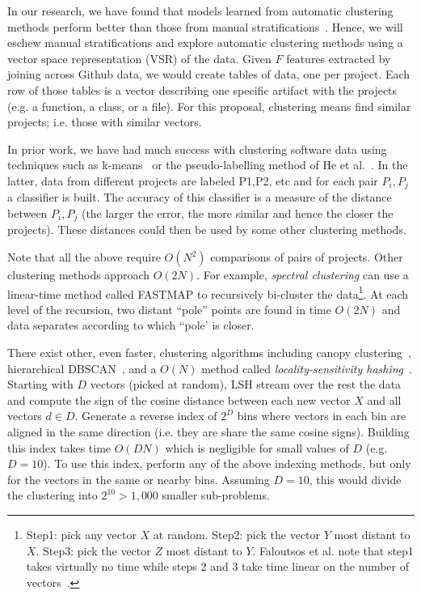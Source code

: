 In our research, we have found that models learned from automatic clustering methods
perform better than those from manual stratifications~\cite{meTSE06,meTSE12lcoalglobal}.
Hence, we will eschew manual stratifications and explore automatic clustering methods
using a vector space representation (VSR) of the data.
Given $F$ features extracted by joining across Github data, we would create tables of data, one per project. Each row of those tables is a vector describing  one specific artifact with the projects (e.g. a function, a class, or a file). For this proposal, clustering means find similar projects; i.e. those with similar vectors.


In prior work,
we have had much success with
   clustering software data using techniques 
such as k-means~\cite{suvodeepMSR18} or 
 the pseudo-labelling method of He et al.~\cite{hemenziesESEM13}.  In the latter, data from different projects are labeled P1,P2, etc and for each pair $P_i,P_j$ a classifier is built.
The accuracy of this classifier is a measure of the distance between  $P_i,P_j$  (the larger
the error, the more similar and hence the closer the projects).   These distances could then be used by some other clustering methods. 

Note that all the above require $O(N^2)$ comparisons of pairs of projects.
Other clustering methods approach $O(2N)$. For example,
  {\em spectral clustering}  can use a linear-time method called FASTMAP to recursively bi-cluster the data\footnote{Step1: pick any vector $X$ at random.
  Step2: pick the vector $Y$ most distant to $X$. Step3: pick
  the vector $Z$ most distant to $Y$.
  Faloutsos et al. note that step1 takes virtually no time while
  steps 2 and 3 take 
  time linear on the number of vectors~\cite{faloutsos1995fastmap}.}.
  At each level of the recursion, two distant ``pole'' points are found in time $O(2N)$ and data separates according to which ``pole' is closer.
  
There exist other, even faster, clustering algorithms
including canopy clustering~\cite{McCallum:2000}, hierarchical DBSCAN~\cite{campello2015hierarchical}, and a 
  $O(N)$ method called {\em  locality-sensitivity hashing}~\cite{Andoni:2015}.
Starting with  $D$ vectors (picked at random), LSH stream over the rest the data and compute the
sign of the cosine distance between each new vector $X$ and all vectors $d\in D$. Generate a reverse index of $2^D$ bins where vectors in each bin  are aligned in the same direction (i.e. they are share the same cosine signs).  Building this index takes time $O(DN)$ which is negligible  for small values of
$D$ (e.g. $D=10$). To use this index, perform  any of the above indexing methods, but only for the vectors in the same or nearby bins. Assuming $D=10$, this would divide the clustering into $2^{10}> 1,000$ smaller sub-problems. 


